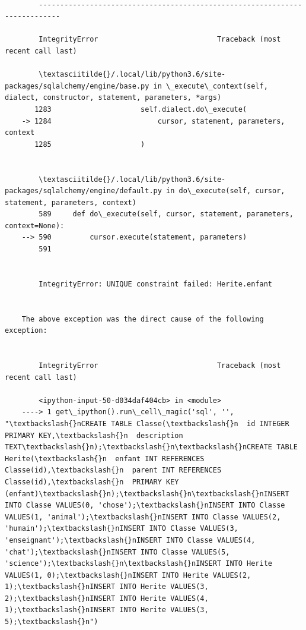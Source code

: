 \documentclass[11pt]{article}
\begin{document}
    \begin{Verbatim}[commandchars=\\\{\}]

        ---------------------------------------------------------------------------

        IntegrityError                            Traceback (most recent call last)

        \textasciitilde{}/.local/lib/python3.6/site-packages/sqlalchemy/engine/base.py in \_execute\_context(self, dialect, constructor, statement, parameters, *args)
       1283                     self.dialect.do\_execute(
    -> 1284                         cursor, statement, parameters, context
       1285                     )


        \textasciitilde{}/.local/lib/python3.6/site-packages/sqlalchemy/engine/default.py in do\_execute(self, cursor, statement, parameters, context)
        589     def do\_execute(self, cursor, statement, parameters, context=None):
    --> 590         cursor.execute(statement, parameters)
        591 


        IntegrityError: UNIQUE constraint failed: Herite.enfant

        
    The above exception was the direct cause of the following exception:


        IntegrityError                            Traceback (most recent call last)

        <ipython-input-50-d034daf404cb> in <module>
    ----> 1 get\_ipython().run\_cell\_magic('sql', '', "\textbackslash{}nCREATE TABLE Classe(\textbackslash{}n  id INTEGER PRIMARY KEY,\textbackslash{}n  description TEXT\textbackslash{}n);\textbackslash{}n\textbackslash{}nCREATE TABLE Herite(\textbackslash{}n  enfant INT REFERENCES Classe(id),\textbackslash{}n  parent INT REFERENCES Classe(id),\textbackslash{}n  PRIMARY KEY (enfant)\textbackslash{}n);\textbackslash{}n\textbackslash{}nINSERT INTO Classe VALUES(0, 'chose');\textbackslash{}nINSERT INTO Classe VALUES(1, 'animal');\textbackslash{}nINSERT INTO Classe VALUES(2, 'humain');\textbackslash{}nINSERT INTO Classe VALUES(3, 'enseignant');\textbackslash{}nINSERT INTO Classe VALUES(4, 'chat');\textbackslash{}nINSERT INTO Classe VALUES(5, 'science');\textbackslash{}n\textbackslash{}nINSERT INTO Herite VALUES(1, 0);\textbackslash{}nINSERT INTO Herite VALUES(2, 1);\textbackslash{}nINSERT INTO Herite VALUES(3, 2);\textbackslash{}nINSERT INTO Herite VALUES(4, 1);\textbackslash{}nINSERT INTO Herite VALUES(3, 5);\textbackslash{}n")
    


\end{Verbatim}
\end{document}
